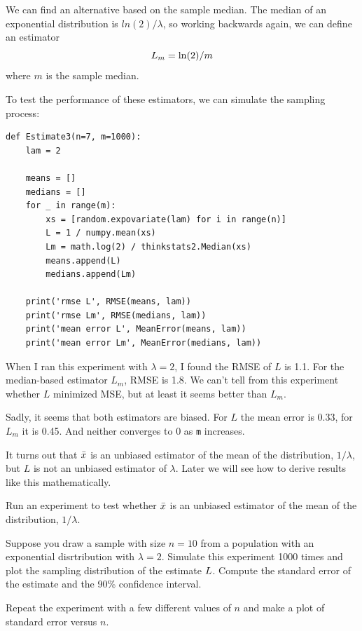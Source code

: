 \documentclass[12pt]{book}
\begin{document}
We can find an alternative based on the sample median.
The median of an exponential distribution is $ln(2) / \lambda$,
so working backwards again, we can define an estimator
%
\[ L_m = \ln(2) / m \]
%
where $m$ is the sample median.

To test the performance of these estimators, we can simulate the
sampling process:

\begin{verbatim}
def Estimate3(n=7, m=1000):
    lam = 2

    means = []
    medians = []
    for _ in range(m):
        xs = [random.expovariate(lam) for i in range(n)]
        L = 1 / numpy.mean(xs)
        Lm = math.log(2) / thinkstats2.Median(xs)
        means.append(L)
        medians.append(Lm)

    print('rmse L', RMSE(means, lam))
    print('rmse Lm', RMSE(medians, lam))
    print('mean error L', MeanError(means, lam))
    print('mean error Lm', MeanError(medians, lam))
\end{verbatim}

When I ran this experiment with $\lambda=2$, I found the RMSE of $L$ is 
1.1.  For the median-based estimator $L_m$, RMSE is 1.8.  We can't
tell from this experiment whether $L$ minimized MSE, but at least
it seems better than $L_m$.

Sadly, it seems that both estimators are biased.  For $L$ the mean
error is 0.33, for $L_m$ it is 0.45.  And neither converges to 0
as {\tt m} increases.

It turns out that $\bar{x}$ is an unbiased estimator of the mean
of the distribution, $1 / \lambda$, but $L$ is not an unbiased
estimator of $\lambda$.  Later we will see how to derive results
like this mathematically.

\begin{exercise}

Run an experiment to test whether $\bar{x}$ is an unbiased estimator of
the mean of the distribution, $1 / \lambda$.

\end{exercise}

\begin{exercise}

Suppose you draw a sample with size $n=10$ from a population 
with an exponential disrtribution with $\lambda=2$.  Simulate
this experiment 1000 times and plot the sampling distribution of
the estimate $L$.  Compute the standard error of the estimate
and the 90\% confidence interval.

Repeat the experiment with a few different values of $n$ and make
a plot of standard error versus $n$.

\end{exercise}
\end{document}

